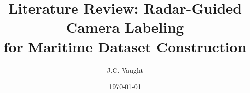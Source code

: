 

\title{Literature Review: Radar-Guided Camera Labeling\\for Maritime Dataset Construction}
\author{J.C. Vaught}
\date{\today}



\maketitle

\tableofcontents
\newpage























